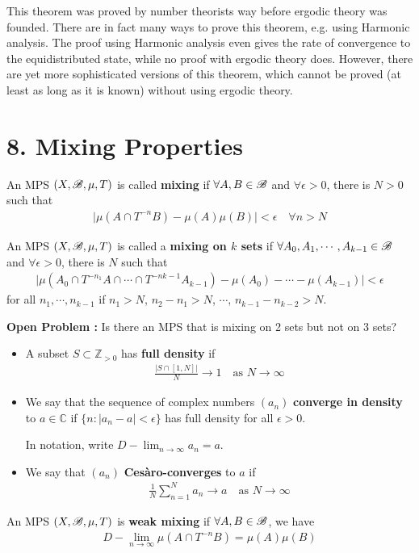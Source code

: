 \documentclass[10pt,a4paper]{report}
\begin{document}
This theorem was proved by number theorists way before ergodic theory was founded. There are in fact many ways to prove this theorem, e.g. using Harmonic analysis. The proof using Harmonic analysis even gives the rate of convergence to the equidistributed state, while no proof with ergodic theory does. However, there are yet more sophisticated versions of this theorem, which cannot be proved (at least as long as it is known) without using ergodic theory.
\s

\section*{8. Mixing Properties}

 An MPS $(X,\mathscr{B}, \mu,T)$ is called \textbf{mixing} if $\forall A,B\in \mathscr{B}$ and $\forall \epsilon>0$, there is $N>0$ such that
\begin{align*}
\Big| \mu(A\cap T^{-n}B) - \mu(A)\mu(B) \Big| < \epsilon \quad \forall n >N
\end{align*}
\s

 An MPS $(X,\mathscr{B}, \mu, T)$ is called a \textbf{mixing on $k$ sets} if $\forall A_0, A_1, \cdots,A_{k-1} \in \mathscr{B}$ and $\forall \epsilon >0$, there is $N$ such that
\begin{align*}
\Big| \mu(A_0 \cap T^{-n_1} A \cap \cdots \cap T^{-nk-1}A_{k-1}) - \mu(A_0) -\cdots -\mu(A_{k-1}) \Big| < \epsilon
\end{align*}
for all $n_1, \cdots, n_{k-1}$ if $n_1>N$, $n_2-n_1>N$, $\cdots$, $n_{k-1} - n_{k-2} >N$.
\s

\textbf{Open Problem :} Is there an MPS that is mixing on 2 sets but not on 3 sets?
\s

\begin{itemize}
\item A subset $S \subset \mathbb{Z}_{>0}$ has \textbf{full density} if
\begin{align*}
\frac{|S\cap [1,N]|}{N} \rightarrow 1 \quad \text{as } N\rightarrow \infty
\end{align*}
\item We say that the sequence of complex numbers $(a_n)$ \textbf{converge in density} to $a\in \mathbb{C}$ if $\{n: |a_n -a| <\epsilon \}$ has full density for all $\epsilon >0$.

In notation, write $D-\lim_{n\rightarrow \infty} a_n = a$.
\item We say that $(a_n)$ \textbf{Ces\`{a}ro-converges} to $a$ if
\begin{align*}
\frac{1}{N} \sum_{n=1}^N a_n \rightarrow a \quad \text{as } N\rightarrow \infty
\end{align*}
\end{itemize}
\s

 An MPS $(X,\mathscr{B}, \mu, T)$ is \textbf{weak mixing} if $\forall A,B \in \mathscr{B}$, we have
\begin{align*}
D-\lim_{n\rightarrow \infty} \mu(A \cap T^{-n}B) = \mu(A) \mu(B)
\end{align*}
\s
\end{document}
